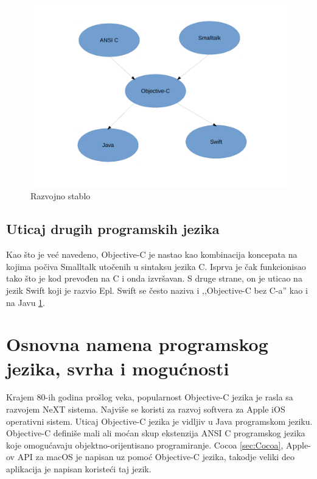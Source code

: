 \documentclass[a4paper]{article}
\begin{document}
{\begin{figure}[h!]
	\begin{center}
	\includegraphics[scale=0.4]{razvojno_stablo.pdf}
	\caption{Razvojno stablo}	
	\label{fig:Razvojno_stablo}
	\end{center}
\end{figure}

\subsection{Uticaj drugih programskih jezika}
\label{subsec:uticaj}
Kao što je već navedeno, Objective-C je nastao kao kombinacija koncepata na kojima počiva Smalltalk utočenih u sintaksu jezika C. Isprva je čak funkcionisao tako što je kod prevođen na C i onda izvršavan. S druge strane, on je uticao na jezik Swift koji je razvio Epl. Swift \cite{swift} se često naziva i ,,Objective-C bez C-a'' kao i na Javu \ref{fig:Razvojno_stablo}. 

\section{Osnovna namena programskog jezika, svrha i mogućnosti}
\label{sec:namena}
Krajem 80-ih godina prošlog veka, popularnost Objective-C jezika je rasla sa razvojem NeXT sistema. Najviše se koristi za razvoj softvera za Apple iOS operativni sistem. Uticaj Objective-C jezika je vidljiv u Java programskom jeziku.
Objective-C definiše mali ali moćan skup ekstenzija ANSI C programskog jezika koje omogućavaju objektno-orijentisano programiranje. Cocoa \ref{sec:Cocoa}, Apple-ov API za macOS je napisan uz pomoć Objective-C jezika, takodje veliki deo aplikacija je napisan koristeći taj jezik. 

}
\end{document}
